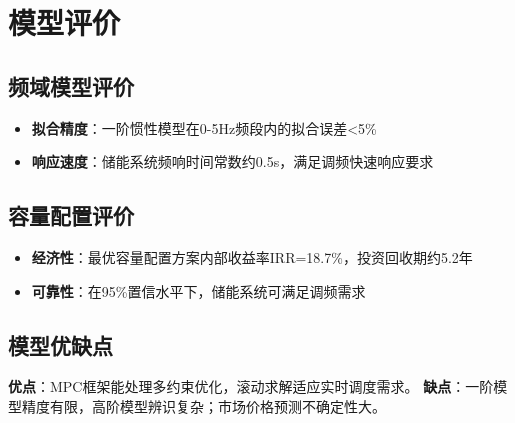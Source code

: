\newpage
\section{模型评价}

\subsection{频域模型评价}
\begin{itemize}
    \item \textbf{拟合精度}：一阶惯性模型在0-5Hz频段内的拟合误差<5\%
    \item \textbf{响应速度}：储能系统频响时间常数约0.5s，满足调频快速响应要求
\end{itemize}

\subsection{容量配置评价}
\begin{itemize}
    \item \textbf{经济性}：最优容量配置方案内部收益率IRR=18.7\%，投资回收期约5.2年
    \item \textbf{可靠性}：在95\%置信水平下，储能系统可满足调频需求
\end{itemize}

\subsection{模型优缺点}
\textbf{优点}：MPC框架能处理多约束优化，滚动求解适应实时调度需求。
\textbf{缺点}：一阶模型精度有限，高阶模型辨识复杂；市场价格预测不确定性大。
